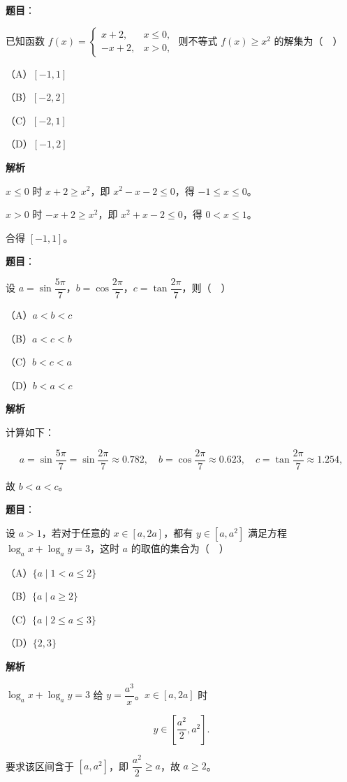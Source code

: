 \begin{answer}

\textbf{题目}：

已知函数 $f(x)=\begin{cases}x+2,&x\leqslant0,\\ -x+2,&x>0,\end{cases}$ 则不等式 $f(x)\geqslant x^2$ 的解集为（　）

（A）$[-1,1]$

（B）$[-2,2]$

（C）$[-2,1]$

（D）$[-1,2]$

\textbf{解析}

$x\leqslant0$ 时 $x+2\geqslant x^2$，即 $x^2-x-2\leqslant0$，得 $-1\leqslant x\leqslant0$。

$x>0$ 时 $-x+2\geqslant x^2$，即 $x^2+x-2\leqslant0$，得 $0<x\leqslant1$。

合得 $[-1,1]$。


\end{answer}
\begin{answer}

\textbf{题目}：

设 $a=\sin\dfrac{5\pi}7$，$b=\cos\dfrac{2\pi}7$，$c=\tan\dfrac{2\pi}7$，则（　）

（A）$a<b<c$

（B）$a<c<b$

（C）$b<c<a$

（D）$b<a<c$

\textbf{解析}

计算如下：

\nopagebreak[4]
\[a=\sin\frac{5\pi}7=\sin\frac{2\pi}7\approx0.782,\quad b=\cos\frac{2\pi}7\approx0.623,\quad c=\tan\frac{2\pi}7\approx1.254,\]

故 $b<a<c$。


\end{answer}
\begin{answer}

\textbf{题目}：

设 $a>1$，若对于任意的 $x\in[a,2a]$，都有 $y\in[a,a^2]$ 满足方程 $\log_ax+\log_ay=3$，这时 $a$ 的取值的集合为（　）

（A）$\{a\mid1<a\leqslant2\}$

（B）$\{a\mid a\geqslant2\}$

（C）$\{a\mid2\leqslant a\leqslant3\}$

（D）$\{2,3\}$

\textbf{解析}

$\log_ax+\log_ay=3$ 给 $y=\dfrac{a^3}x$。$x\in[a,2a]$ 时

\nopagebreak[4]
\[y\in\left[\frac{a^2}2,a^2\right].\]

要求该区间含于 $[a,a^2]$，即 $\dfrac{a^2}2\geqslant a$，故 $a\geqslant2$。


\end{answer}

